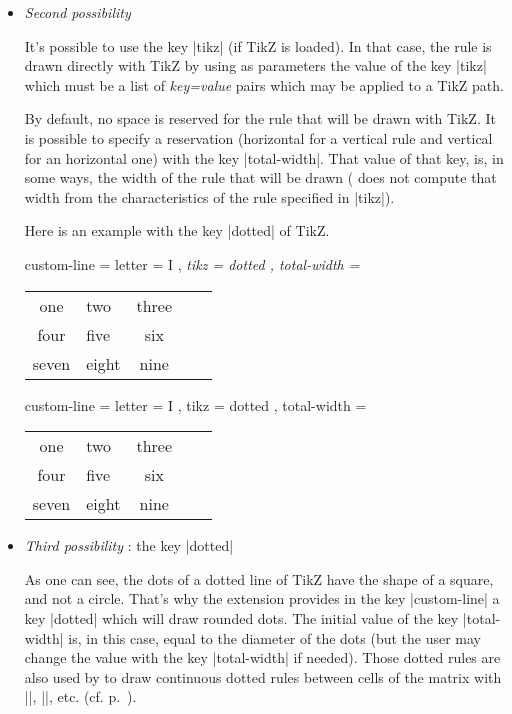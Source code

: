 \documentclass[dvipsnames]{article}%
\begin{document}
\begin{itemize}
\bigskip
\item \emph{Second possibility}\par\nobreak


It's possible to use the key |tikz| (if TikZ is loaded). In that case, the
rule is drawn directly with TikZ by using as parameters the value of the key
|tikz| which must be a list of \textsl{key=value} pairs which may be applied
to a TikZ path.

By default, no space is reserved for the rule that will be drawn with TikZ. It
is possible to specify a reservation (horizontal for a vertical rule and
vertical for an horizontal one) with the key |total-width|. That value of that
key, is, in some ways, the width of the rule that will be drawn
( does not compute that width from the characteristics of the
rule specified in |tikz|).



\bigskip
Here is an example with the key |dotted| of TikZ.

\begin{Code}[width=9cm]
\NiceMatrixOptions
  {
    custom-line = 
     {
       letter = I , 
       \emph{tikz = dotted ,
       total-width = \pgflinewidth}
     }
  }

\begin{NiceTabular}{cIcIc}
one & two & three \\
four & five & six \\
seven & eight & nine
\end{NiceTabular}
\end{Code}
\begin{scope}
\NiceMatrixOptions
  {
    custom-line = 
     {
       letter = I , 
       tikz = dotted ,
       total-width = \pgflinewidth
     }
  }
\begin{NiceTabular}{cIcIc}
one & two & three \\
four & five & six \\
seven & eight & nine
\end{NiceTabular}
\end{scope}

\bigskip
\item \emph{Third possibility} : the key |dotted|
\label{dotted}

As one can see, the dots of a dotted line of TikZ have the shape of a square,
and not a circle. That's why the extension  provides in the
key |custom-line| a key |dotted| which will draw rounded dots. The initial
value of the key |total-width| is, in this case, equal to the diameter of the dots
(but the user may change the value with the key |total-width| if needed). Those
dotted rules are also used by  to draw continuous dotted rules
between cells of the matrix with |\Cdots|, |\Vdots|, etc. (cf. p.~\pageref{Cdots}).


\end{itemize}
\end{document}
